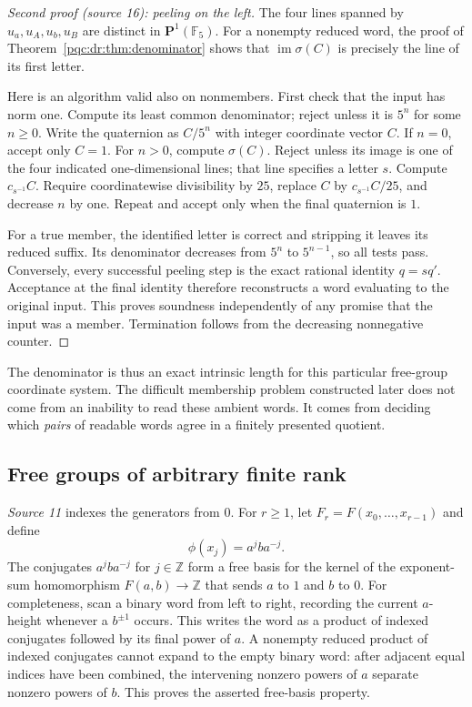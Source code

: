 \documentclass[11pt,letterpaper]{article}
\numberwithin{equation}{section}
\theoremstyle{definition}
\theoremstyle{remark}
\newcommand{\Z}{\mathbb Z}
\newcommand{\FF}{\mathbb F}
\newcommand{\im}{\operatorname{im}}
\begin{document}
\begin{proof}[Second proof (source 16): peeling on the left]
The four lines spanned by $u_a,u_A,u_b,u_B$ are distinct in
$\mathbf P^1(\FF_5)$. For a nonempty reduced word, the proof of
Theorem~\ref{pqc:dr:thm:denominator} shows that $\im\sigma(C)$ is precisely
the line of its first letter.

Here is an algorithm valid also on nonmembers. First check that the input
has norm one. Compute its least common denominator; reject unless it is
$5^n$ for some $n\geq0$. Write the quaternion as $C/5^n$ with integer
coordinate vector $C$. If $n=0$, accept only $C=1$.
For $n>0$, compute $\sigma(C)$. Reject unless its image is one of the
four indicated one-dimensional lines; that line specifies a letter $s$.
Compute $c_{s^{-1}}C$. Require coordinatewise divisibility by $25$,
replace $C$ by $c_{s^{-1}}C/25$, and decrease $n$ by one.
Repeat and accept only when the final quaternion is $1$.

For a true member, the identified letter is correct and stripping it
leaves its reduced suffix. Its denominator decreases from $5^n$ to
$5^{n-1}$, so all tests pass. Conversely, every successful peeling step
is the exact rational identity $q=sq'$. Acceptance at the final identity
therefore reconstructs a word evaluating to the original input. This
proves soundness independently of any promise that the input was a
member. Termination follows from the decreasing nonnegative counter.
\end{proof}
The denominator is thus an exact intrinsic length for this particular
free-group coordinate system. The difficult membership problem constructed
later does not come from an inability to read these ambient words. It
comes from deciding which \emph{pairs} of readable words agree in a
finitely presented quotient.

\subsection{Free groups of arbitrary finite rank}
\label{pqc:dr:sec:spin}\label{pqc:gates:sec:rank}
\emph{Source 11} indexes the generators from $0$.
For $r\geq1$, let $F_r=F(x_0,\ldots,x_{r-1})$ and define
\begin{equation}\label{pqc:rr:eq:rankembedding}
 \phi(x_j)=a^jba^{-j}.
\end{equation}
The conjugates $a^jba^{-j}$ for $j\in\Z$ form a free basis for the kernel
of the exponent-sum homomorphism $F(a,b)\to\Z$ that sends $a$ to $1$
and $b$ to $0$. For completeness, scan a binary word from left to right,
recording the current $a$-height whenever a $b^{\pm1}$ occurs. This writes
the word as a product of indexed conjugates followed by its final power
of $a$. A nonempty reduced product of indexed conjugates cannot expand
to the empty binary word: after adjacent equal indices have been
combined, the intervening nonzero powers of $a$ separate nonzero powers
of $b$. This proves the asserted free-basis property.
\end{document}
